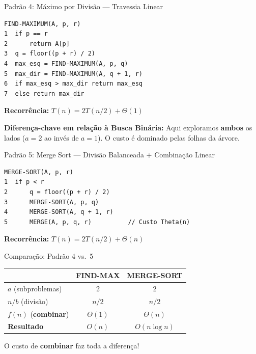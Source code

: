 \documentclass[aspectratio=169]{beamer}
\begin{document}
\begin{frame}{Padrão 4: Máximo por Divisão --- Travessia Linear}
\begin{verbatim}
FIND-MAXIMUM(A, p, r)
1  if p == r
2      return A[p]
3  q = floor((p + r) / 2)
4  max_esq = FIND-MAXIMUM(A, p, q)
5  max_dir = FIND-MAXIMUM(A, q + 1, r)
6  if max_esq > max_dir return max_esq
7  else return max_dir
\end{verbatim}
    \textbf{Recorrência:} $T(n) = 2T(n/2) + \Theta(1)$

    \vspace{0.2cm}
    \textbf{Diferença-chave em relação à Busca Binária:} Aqui exploramos \textbf{ambos} os lados ($a=2$ ao invés de $a=1$). O custo é dominado pelas folhas da árvore.
    
    \vspace{0.2cm}
    \hfill{}
\end{frame}

\begin{frame}{Padrão 5: Merge Sort --- Divisão Balanceada + Combinação Linear}
\begin{verbatim}
MERGE-SORT(A, p, r)
1  if p < r
2      q = floor((p + r) / 2)
3      MERGE-SORT(A, p, q)
4      MERGE-SORT(A, q + 1, r)
5      MERGE(A, p, q, r)          // Custo Theta(n)
\end{verbatim}
    \textbf{Recorrência:} $T(n) = 2T(n/2) + \Theta(n)$
    
    \vspace{0.2cm}
    \begin{block}{Comparação: Padrão 4 vs.\ 5}
        \begin{center}
        \renewcommand{\arraystretch}{1.2}
        \begin{tabular}{lcc}
            & FIND-MAX & MERGE-SORT \\
            \midrule
            $a$ (subproblemas) & 2 & 2 \\
            $n/b$ (divisão) & $n/2$ & $n/2$ \\
            $f(n)$ (\textbf{combinar}) & $\Theta(1)$ & $\Theta(n)$ \\
            \textbf{Resultado} & $O(n)$ & $O(n \log n)$ \\
        \end{tabular}
        \end{center}
        O custo de \textbf{combinar} faz toda a diferença!
    \end{block}
\end{frame}
\end{document}
